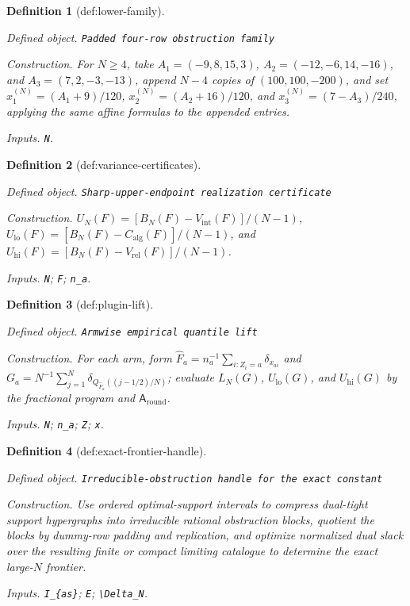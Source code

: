 \documentclass{article}
\newtheorem{definition}{Definition}
\begin{document}
\begin{definition}[def:lower-family]\label{def:lower-family}
\par\smallskip\noindent\emph{Defined object.} \texttt{Padded four-\allowbreak{}row obstruction family}
\par\smallskip\noindent\emph{Construction.} For \(N\ge4\), take \(A_1=(-9,8,15,3)\), \(A_2=(-12,-6,14,-16)\), and \(A_3=(7,2,-3,-13)\), append \(N-4\) copies of \((100,100,-200)\), and set \(x^{(N)}_1=(A_1+9)/120\), \(x^{(N)}_2=(A_2+16)/120\), and \(x^{(N)}_3=(7-A_3)/240\), applying the same affine formulas to the appended entries.
\par\smallskip\noindent\emph{Inputs.} \texttt{N}.
\end{definition}

\begin{definition}[def:variance-certificates]\label{def:variance-certificates}
\par\smallskip\noindent\emph{Defined object.} \texttt{Sharp-\allowbreak{}upper-\allowbreak{}endpoint realization certificate}
\par\smallskip\noindent\emph{Construction.} \(U_N(F)=[B_N(F)-V_{\mathrm{int}}(F)]/(N-1)\), \(U_{\mathrm{lo}}(F)=[B_N(F)-C_{\mathrm{alg}}(F)]/(N-1)\), and \(U_{\mathrm{hi}}(F)=[B_N(F)-V_{\mathrm{rel}}(F)]/(N-1)\).
\par\smallskip\noindent\emph{Inputs.} \texttt{N}; \texttt{F}; \texttt{n\_\allowbreak{}a}.
\end{definition}

\begin{definition}[def:plugin-lift]\label{def:plugin-lift}
\par\smallskip\noindent\emph{Defined object.} \texttt{Armwise empirical quantile lift}
\par\smallskip\noindent\emph{Construction.} For each arm, form \(\widehat F_a=n_a^{-1}\sum_{i:Z_i=a}\delta_{x_{ai}}\) and \(G_a=N^{-1}\sum_{j=1}^N\delta_{Q_{\widehat F_a}((j-1/2)/N)}\); evaluate \(L_N(G)\), \(U_{\mathrm{lo}}(G)\), and \(U_{\mathrm{hi}}(G)\) by the fractional program and \(\mathsf A_{\mathrm{round}}\).
\par\smallskip\noindent\emph{Inputs.} \texttt{N}; \texttt{n\_\allowbreak{}a}; \texttt{Z}; \texttt{x}.
\end{definition}

\begin{definition}[def:exact-frontier-handle]\label{def:exact-frontier-handle}
\par\smallskip\noindent\emph{Defined object.} \texttt{Irreducible-\allowbreak{}obstruction handle for the exact constant}
\par\smallskip\noindent\emph{Construction.} Use ordered optimal-support intervals to compress dual-tight support hypergraphs into irreducible rational obstruction blocks, quotient the blocks by dummy-row padding and replication, and optimize normalized dual slack over the resulting finite or compact limiting catalogue to determine the exact large-\(N\) frontier.
\par\smallskip\noindent\emph{Inputs.} \texttt{I\_\allowbreak{}\{as\}\allowbreak{}}; \texttt{E}; \texttt{\textbackslash{}\allowbreak{}Delta\_\allowbreak{}N}.
\end{definition}
\end{document}

